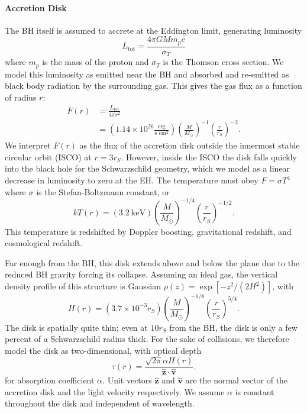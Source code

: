 \documentclass[twocolumn,twocolappendix]{aastex631}
\newcommand{\parens}[1]{\left(#1\right)}
\begin{document}
\paragraph{Accretion Disk} The BH itself is assumed to accrete at the Eddington limit, generating luminosity 
\begin{equation}
  L_\text{tot} = \frac{4\pi GMm_pc}{\sigma_T}
\end{equation}
where $m_p$ is the mass of the proton and $\sigma_T$ is the Thomson cross section.
We model this luminosity as emitted near the BH and absorbed and re-emitted as black body radiation by the surrounding gas. This gives the gas flux as a function of radius $r$:
\begin{equation}
  \begin{split}
    F(r) &= \frac{L_\text{tot}}{4\pi r^2} \\&= \parens{1.14\times10^{26}\frac{\text{erg}}{\text{s\ cm}^2}}\parens{\frac{M}{M_\odot}}^{-1}\parens{\frac{r}{r_S}}^{-2}.
  \end{split}
\end{equation}
We interpret $F(r)$ as the flux of the accretion disk outside the innermost stable circular orbit (ISCO) at $r = 3r_S$. However, inside the ISCO the disk falls quickly into the black hole for the Schwarzschild geometry, which we model as a linear decrease in luminosity to zero at the EH. The temperature must obey $F = \sigma T^4$ where $\sigma$ is the Stefan-Boltzmann constant, or
\begin{equation}
    kT(r) =(3.2\ \text{keV})\parens{\frac{M}{M_\odot}}^{-1/4}\parens{\frac{r}{r_S}}^{-1/2}.
    \label{eqn:disk-temp}
\end{equation}
This temperature is redshifted by Doppler boosting, gravitational redshift, and cosmological redshift.

Far enough from the BH, this disk extends above and below the plane due to the reduced BH gravity forcing its collapse. Assuming an ideal gas, the vertical density profile of this structure is Gaussian $\rho(z) = \exp[-z^2/(2H^2)]$, with
\begin{equation}
  H(r) = (3.7 \times 10^{-3} r_S) \parens{\frac{M}{M_\odot}}^{-1/8}\parens{\frac{r}{r_S}}^{5/4}.
\end{equation}
The disk is spatially quite thin; even at $10 r_S$ from the BH, the disk is only a few percent of a Schwarzschild radius thick. For the sake of collisions, we therefore model the disk as two-dimensional, with optical depth
\begin{equation}
  \tau(r) = \frac{\sqrt{2\pi}\alpha H(r)}{\hat{\mathbf z} \cdot \hat{\mathbf v}}.
\end{equation}
for absorption coefficient $\alpha$. Unit vectors $\hat{\mathbf z}$ and $\hat{\mathbf v}$ are the normal vector of the accretion disk and the light velocity respectively. We assume $\alpha$ is constant throughout the disk and independent of wavelength.
\end{document}
